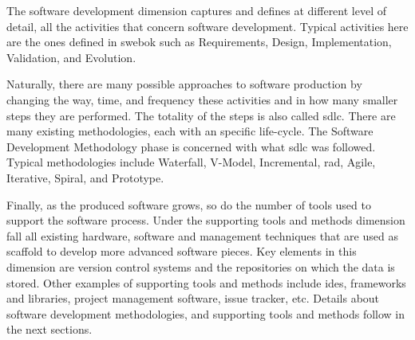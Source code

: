 The software development dimension captures and defines at different level of detail, all the activities that concern software development. Typical activities here are the ones defined in \gls{swebok} \citep{borque2014guide} such as Requirements, Design, Implementation, Validation, and Evolution. 

Naturally, there are many possible approaches to software production by changing the way, time, and frequency these activities and in how many smaller steps they are performed.
The totality of the steps is also called \gls{sdlc}.  There are many existing methodologies, each with an specific life-cycle.
The Software Development Methodology phase is concerned with what \gls{sdlc} was followed. Typical methodologies include Waterfall, V-Model, Incremental, \gls{rad}, Agile, Iterative,  Spiral, and Prototype.



Finally, as the produced software grows, so do the number of tools used to support the software process. Under the supporting tools and methods dimension fall all existing hardware, software and management techniques that are used as scaffold to develop more advanced software pieces. Key elements in this dimension are version control systems and the repositories on which the data is stored. Other examples of supporting tools and methods include \glspl{ide}, frameworks and libraries, project management software, issue tracker, etc. Details about software development methodologies, and supporting tools and methods follow in the next sections.







